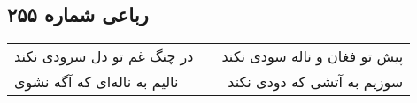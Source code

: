 \begin{center}
\section*{رباعی شماره ۲۵۵}
\label{sec:sh255}
\begin{longtable}{l p{0.5cm} r}
در چنگ غم تو دل سرودی نکند
&&
پیش تو فغان و ناله سودی نکند
\\
نالیم به ناله‌ای که آگه نشوی
&&
سوزیم به آتشی که دودی نکند
\\
\end{longtable}
\end{center}
